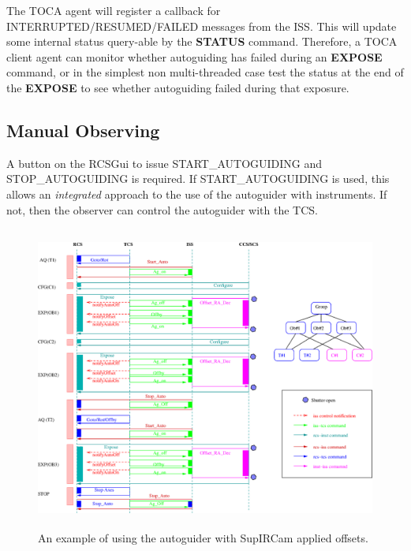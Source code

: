 \documentclass{article}
\begin{document}
The TOCA agent will register a callback for INTERRUPTED/RESUMED/FAILED messages from the ISS. This will
update some internal status query-able by the {\bf STATUS} command. Therefore, a TOCA client agent can monitor
whether autoguiding has failed during an {\bf EXPOSE} command, or in the simplest non multi-threaded case test
the status at the end of the {\bf EXPOSE} to see whether autoguiding failed during that exposure.

\subsection{Manual Observing}

A button on the RCSGui to issue START\_AUTOGUIDING
and STOP\_AUTOGUIDING is required.  If START\_AUTOGUIDING
is used, this allows an \emph{integrated} approach to the
use of the autoguider with instruments.  If not,
then the observer can control the autoguider with the
TCS. 

\newpage

   \begin{figure}[h]
   \begin{center}
   \includegraphics[height=10cm]{iss_ag_case1.eps}
   \end{center}
   \label{fig:case1} 
   \caption[SupIRCam Use case.] 
   {An example of using the autoguider with SupIRCam applied offsets.}
   \end{figure} 
\end{document}
